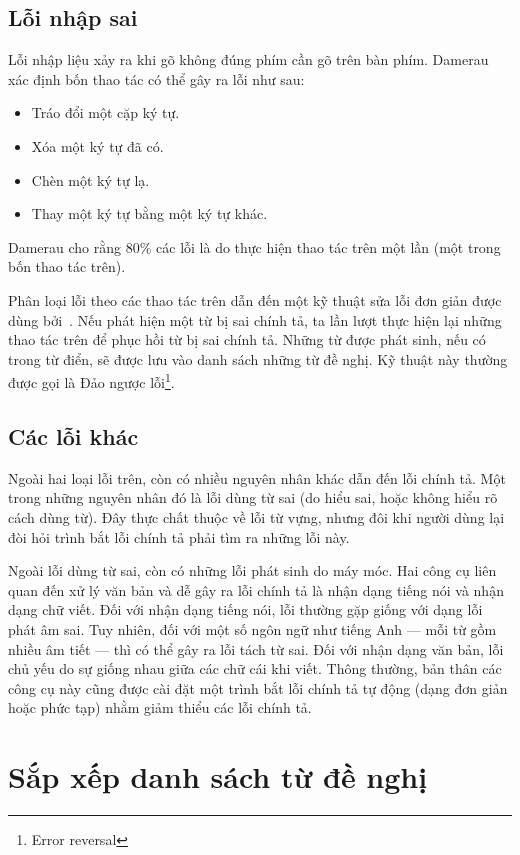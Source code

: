 \documentclass[a4paper,oneside,14pt]{extbook} %
\begin{document}
\subsection{Lỗi nhập sai}

Lỗi nhập liệu xảy ra khi gõ không
đúng phím cần gõ trên bàn phím. Damerau~\cite{Damerau} xác định bốn thao
tác có thể gây ra lỗi như sau:
\begin{itemize}
\item Tráo đổi một cặp ký tự.
\item Xóa một ký tự đã có.
\item Chèn một ký tự lạ.
\item Thay một ký tự bằng một ký tự khác.
\end{itemize}

Damerau cho rằng 80\% các lỗi là do thực hiện thao tác trên  một lần
(một trong bốn thao tác trên).

Phân loại lỗi theo các thao tác trên dẫn đến một kỹ thuật sửa lỗi đơn
giản được dùng bởi~\cite{Petersonb}. Nếu phát hiện một từ bị sai
chính tả, ta lần lượt thực hiện lại những thao tác trên để phục hồi từ
bị sai chính tả. Những từ được phát sinh, nếu có trong từ điển, sẽ
được lưu vào danh sách những từ đề nghị. Kỹ thuật này thường được gọi
là Đảo ngược lỗi\footnote{Error reversal}.

\subsection{Các lỗi khác}

Ngoài hai loại lỗi trên, còn có nhiều nguyên nhân khác dẫn đến lỗi
chính tả. Một trong những nguyên nhân đó là lỗi dùng từ sai (do hiểu
sai, hoặc không hiểu rõ cách dùng từ). Đây thực chất thuộc về lỗi từ
vựng, nhưng đôi khi người dùng lại đòi hỏi trình bắt lỗi chính tả phải
tìm ra những lỗi này.

Ngoài lỗi dùng từ sai, còn có những lỗi phát sinh do máy móc. Hai công
cụ liên quan đến xử lý văn bản và dễ gây ra lỗi chính tả là nhận dạng
tiếng nói và nhận dạng chữ viết. Đối với nhận dạng tiếng nói, lỗi
thường gặp giống với dạng lỗi phát âm sai. Tuy nhiên, đối với một số
ngôn ngữ như tiếng Anh --- mỗi từ gồm nhiều âm tiết --- thì có thể gây
ra lỗi tách từ sai. Đối với nhận dạng văn bản, lỗi chủ yếu do sự giống
nhau giữa các chữ cái khi viết. Thông thường, bản thân các công cụ này
cũng được cài đặt một trình bắt lỗi chính tả tự động (dạng đơn giản
hoặc phức tạp) nhằm giảm thiểu các lỗi chính tả.

\section{Sắp xếp danh sách từ đề nghị}
\label{sec:sort-candidates}
\end{document}
